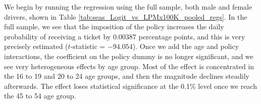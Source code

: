 


% 




We begin by running the regression using the full sample, 
both male and female drivers, 
shown in 
Table \ref{tab:seas_Logit_vs_LPMx100K_pooled_regs}.
% 
% 
In the full sample, we see that the imposition of the policy increases the daily probability 
of receiving a ticket by $0.00387$ percentage points, 
and this is very precisely estimated ($t$-statistic = $-94.054$). 
Once we add the age and policy interactions, 
the coefficient on the policy dummy is no longer significant, 
and we see very heterogeneous effects by age group. 
Most of the effect is concentrated in the 16 to 19 and 20 to 24 age groups, 
and then the magnitude declines steadily afterwards. 
The effect loses statistical significance at the 0.1\% level once we reach the 45 to 54 age group.

